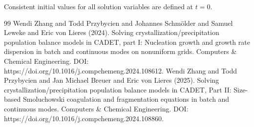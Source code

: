 \documentclass{article}
\begin{document}
Consistent initial values for all solution variables are defined at $t = 0$.
\begin{thebibliography}{99}
     Wendi Zhang and Todd Przybycien and Johannes Schmölder and Samuel Leweke and Eric von Lieres (2024). Solving crystallization/precipitation population balance models in CADET, part I: Nucleation growth and growth rate dispersion in batch and continuous modes on nonuniform grids. Computers \& Chemical Engineering. DOI: https://doi.org/10.1016/j.compchemeng.2024.108612.
     Wendi Zhang and Todd Przybycien and Jan Michael Breuer and Eric von Lieres (2025). Solving crystallization/precipitation population balance models in CADET, Part II: Size-based Smoluchowski coagulation and fragmentation equations in batch and continuous modes. Computers \& Chemical Engineering. DOI: https://doi.org/10.1016/j.compchemeng.2024.108860.
\end{thebibliography}
\end{document}
